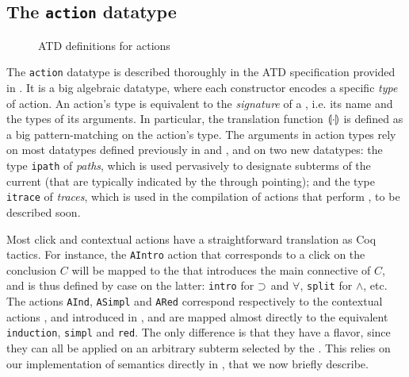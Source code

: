 \subsection{The \texttt{action} datatype}

\begin{figure}
  
  \caption{ATD definitions for actions}
\end{figure}

The \texttt{action} datatype is described thoroughly in the ATD specification
provided in . It is a big algebraic datatype, where each
constructor encodes a specific \emph{type} of action. An action's type is
equivalent to the \emph{signature} of a , i.e. its name and the types of
its arguments. In particular, the translation function $\llparenthesis \cdot \rrparenthesis$ is
defined as a big pattern-matching on the action's type. The arguments in action types rely
on most datatypes defined previously in  and ,
and on two new datatypes: the type \texttt{ipath} of \emph{paths}, which is used
pervasively to designate subterms of the current  (that are typically
indicated by the  through pointing); and the type \texttt{itrace}
of \emph{ traces}, which is used in the compilation of 
actions that perform , to be described soon.

Most click and contextual actions have a straightforward translation as Coq
tactics. For instance, the \texttt{AIntro} action that corresponds to a click on
the conclusion $C$ will be mapped to the   that introduces the main
connective of $C$, and is thus defined by case on the latter: \texttt{intro} for
$\supset$ and $\forall$, \texttt{split} for $\land$, etc. The actions
\texttt{AInd}, \texttt{ASimpl} and \texttt{ARed} correspond respectively to the
contextual actions ,  and 
introduced in , and are mapped almost directly to the equivalent
  \texttt{induction}, \texttt{simpl} and \texttt{red}. The only
difference is that they have a \emph{} flavor, since they can all
be applied on an arbitrary subterm selected by the . This relies
on our implementation of  semantics directly in , that we now
briefly describe.

